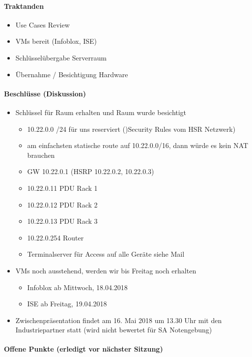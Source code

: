 \paragraph{Traktanden}
\begin{itemize}	
	\item Use Cases Review
	\item VMs bereit (Infoblox, ISE)
	\item Schlüsselübergabe Serverraum
	\item Übernahme / Besichtigung Hardware
\end{itemize}

\paragraph{Beschlüsse (Diskussion)}
\begin{itemize}	
	\item Schlüssel für Raum erhalten und Raum wurde besichtigt
	\begin{itemize}
		\item 10.22.0.0 /24 für uns reserviert ()Security Rules vom HSR Netzwerk)
		\item am einfachsten statische route auf 10.22.0.0/16, dann würde es kein NAT brauchen
		\item GW 10.22.0.1 (HSRP 10.22.0.2, 10.22.0.3)
		\item 10.22.0.11 PDU Rack 1
		\item 10.22.0.12 PDU Rack 2
		\item 10.22.0.13 PDU Rack 3
		\item 10.22.0.254 Router
		\item Terminalserver für Access auf alle Geräte siehe Mail
	\end{itemize}
	\item VMs noch ausstehend, werden wir bis Freitag noch erhalten
	\begin{itemize}
		\item Infoblox ab Mittwoch, 18.04.2018
		\item ISE ab Freitag, 19.04.2018
	\end{itemize}
	\item Zwischenpräsentation findet am 16. Mai 2018 um 13.30 Uhr mit den Industriepartner statt (wird nicht bewertet für SA Notengebung)
\end{itemize}

\paragraph{Offene Punkte (erledigt vor nächster Sitzung)} \mbox{}

